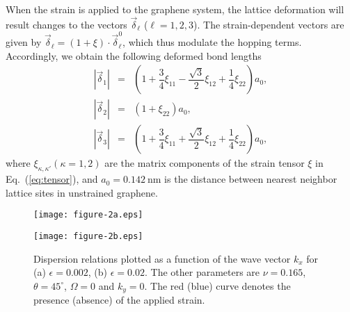 \documentclass[reprint,amsmath,amssymb,aps,superscriptaddress]{revtex4-2}
\begin{document}
When the strain is applied to the graphene system, the lattice deformation will result changes to the vectors $\vec{\delta}_\ell$ ($\ell=1,2,3$). The strain-dependent vectors are given by $\vec{\delta}_{\ell}=(1+\xi)\cdot\vec{\delta}_{\ell}^0$, which thus
modulate the hopping terms. Accordingly, we obtain the following deformed bond lengths
\begin{eqnarray}
	|\vec{\delta}_{1}|&=&(1+\dfrac{3}{4}\xi_{11}-\dfrac{\sqrt{3}}{2}\xi_{12}+\dfrac{1}{4}\xi_{22})a_0,\\
	|\vec{\delta}_{2}|&=&(1+\xi_{22})a_0,\\
	|\vec{\delta}_{3}|&=&(1+\dfrac{3}{4}\xi_{11}+\dfrac{\sqrt{3}}{2}\xi_{12}+\dfrac{1}{4}\xi_{22})a_0,
\end{eqnarray}
where $\xi_{\kappa,\kappa'} (\kappa=1,2)$ are the matrix components of the strain tensor $\xi$ in Eq.~(\ref{eq:tensor}), and $a_0=0.142\ \mathrm{nm}$ is the distance between nearest neighbor lattice sites in unstrained graphene.
\begin{figure}[t]
	\centering
	\texttt{[image: figure-2a.eps]}%
	
	\texttt{[image: figure-2b.eps]}%
	\caption{\label{fig:valley}  Dispersion relations plotted as a function of the wave vector $k_x$ for
		(a) $\epsilon=0.002$, (b) $\epsilon=0.02$.
		The other parameters are $\nu=0.165$, $\theta=45^\circ$, $\Omega=0$ and $k_y=0$. The red (blue) curve
denotes the presence (absence) of the applied strain.}
\end{figure}
\end{document}
